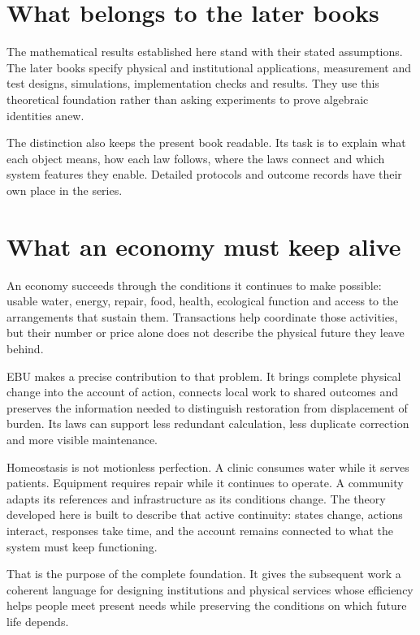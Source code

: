 \section{What belongs to the later books}
The mathematical results established here stand with their stated assumptions. The later books specify physical and institutional applications, measurement and test designs, simulations, implementation checks and results. They use this theoretical foundation rather than asking experiments to prove algebraic identities anew.

The distinction also keeps the present book readable. Its task is to explain what each object means, how each law follows, where the laws connect and which system features they enable. Detailed protocols and outcome records have their own place in the series.

\section{What an economy must keep alive}
An economy succeeds through the conditions it continues to make possible: usable water, energy, repair, food, health, ecological function and access to the arrangements that sustain them. Transactions help coordinate those activities, but their number or price alone does not describe the physical future they leave behind.

EBU makes a precise contribution to that problem. It brings complete physical change into the account of action, connects local work to shared outcomes and preserves the information needed to distinguish restoration from displacement of burden. Its laws can support less redundant calculation, less duplicate correction and more visible maintenance.

Homeostasis is not motionless perfection. A clinic consumes water while it serves patients. Equipment requires repair while it continues to operate. A community adapts its references and infrastructure as its conditions change. The theory developed here is built to describe that active continuity: states change, actions interact, responses take time, and the account remains connected to what the system must keep functioning.

That is the purpose of the complete foundation. It gives the subsequent work a coherent language for designing institutions and physical services whose efficiency helps people meet present needs while preserving the conditions on which future life depends.
